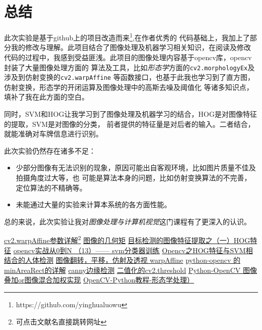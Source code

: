 \documentclass[UTF8,10pt,titlepage,a4paper]{ctexart}
\begin{document}
\section{总结}
此次实验是基于github上的项目改造而来\footnote{https://github.com/yinghualuowu},在作者优秀的
代码基础上，我加上了部分我的修改与理解。此项目结合了图像处理及机器学习相关知识，在阅读及修改
代码的过程中，我感到受益匪浅。此项目的图像处理内容基于opencv库，opencv封装了大量图像处理方面的
算法及工具，比如\emph{形态学}方面的\verb|cv2.morphologyEx|及涉及到仿射变换的\verb|cv2.warpAffine|
等函数接口，也基于此我也学习到了直方图，仿射变换，形态学的开闭运算及图像处理中的高斯去噪及阈值化
等诸多知识点，填补了我在此方面的空白。\par
同时，SVM和HOG让我学习到了图像处理及机器学习的结合，HOG是对图像特征的提取，SVM是对图像的分类，
前者提供的特征量是对后者的输入。二者结合，就能准确对车牌信息进行识别。\par
此次实验仍然存在诸多不足：
\begin{itemize}
  \item 少部分图像有无法识别的现象，原因可能出自客观环境，比如图片质量不佳及拍摄角度过大等，也
  可能是算法本身的问题，比如仿射变换算法的不完善，定位算法的不精确等。
  \item 未能通过大量的实验来计算本系统的各方面性能。
\end{itemize}
总的来说，此次实验让我对\emph{图像处理与计算机视觉}这门课程有了更深入的认识。
\newpage
\begin{thebibliography}{99}
     \href{https://blog.csdn.net/qq878594585/article/details/81838260}{cv2.warpAffine参数详解}\footnote{可点击文献名直接跳转网址}
     \href{https://blog.csdn.net/GDFSG/article/details/51015066}{图像的几何矩}
     \href{https://blog.csdn.net/liulina603/article/details/8291093}{目标检测的图像特征提取之（一）HOG特征}
     \href{https://zhuanlan.zhihu.com/p/48200186}{opencv实战从0到N （13）—— svm分类器训练}
     \href{https://blog.csdn.net/sinat_34604992/article/details/53933004}{Opencv之HOG特征与SVM相结合的人体检测}
     \href{https://www.jianshu.com/p/ef67cacf442c}{图像翻转，平移，仿射及透视 warpAffine}
     \href{https://blog.csdn.net/qq_24237837/article/details/77850496}{python-opencv 的minAreaRect的详解}
     \href{https://www.cnblogs.com/my-love-is-python/p/10397482.html}{canny边缘检测}
     \href{https://www.cnblogs.com/yinliang-liang/p/9293310.html}{二值化的cv2.threshold}
     \href{https://blog.csdn.net/zh_jessica/article/details/77992578}{Python-OpenCV 图像叠加or图像混合加权实现}
     \href{https://blog.csdn.net/sunny2038/article/details/9137759}{OpenCV-Python教程-形态学处理）}
\end{thebibliography}
\end{document}
